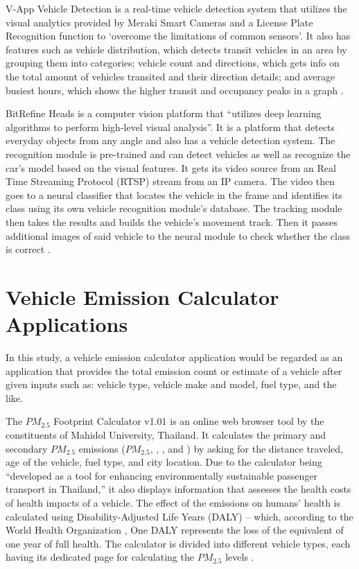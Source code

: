 	V-App Vehicle Detection is a real-time vehicle detection system that utilizes the visual analytics provided by Meraki Smart Cameras and a License Plate Recognition function to ‘overcome the limitations of common sensors’. It also has features such as vehicle distribution, which detects transit vehicles in an area by grouping them into categories; vehicle count and directions, which gets info on the total amount of vehicles transited and their direction details; and average busiest hours, which shows the higher transit and occupancy peaks in a graph \cite{VAPP_ND}.

	BitRefine Heads is a computer vision platform that “utilizes deep learning algorithms to perform high-level visual analysis”. It is a platform that detects everyday objects from any angle and also has a vehicle detection system. The recognition module is pre-trained and can detect vehicles as well as recognize the car’s model based on the visual features. It gets its video source from an Real Time Streaming Protocol (RTSP) stream from an IP camera. The video then goes to a neural classifier that locates the vehicle in the frame and identifies its class using its own vehicle recognition module’s database.  The tracking module then takes the results and builds the vehicle’s movement track. Then it passes additional images of said vehicle to the neural module to check whether the class is correct \cite{BITREFINE_ND}.


\section{Vehicle Emission Calculator Applications}
	In this study, a vehicle emission calculator application would be regarded as an application that provides the total emission count or estimate of a vehicle after given inputs such as: vehicle type, vehicle make and model, fuel type, and the like.
	
	The $PM_{2.5}$ Footprint Calculator v1.01 is an online web browser tool by the constituents of Mahidol University, Thailand. It calculates the primary and secondary $PM_{2.5}$ emissions ($PM_{2.5}$, , , and ) by asking for the distance traveled, age of the vehicle, fuel type, and city location. Due to the calculator being “developed as a tool for enhancing environmentally sustainable passenger transport in Thailand,” it also displays information that assesses the health costs of health impacts of a vehicle. The effect of the emissions on humans’ health is calculated using  Disability-Adjusted Life Years (DALY) – which, according to the World Health Organization \citeyear{WHO_nd}, One DALY represents the loss of the equivalent of one year of full health. The calculator is divided into different vehicle types, each having its dedicated page for calculating the $PM_{2.5}$ levels \cite{pm25_footprint}.
	
